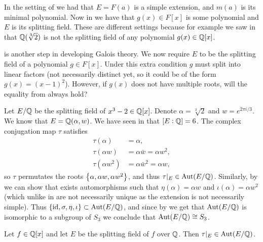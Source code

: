 \documentclass[11pt,a4paper]{article}
\begin{document}
\begin{remark}
  In the setting of 
  we had that $E = F(a)$ is a simple extension,
  and $m(a)$ is its minimal polynomial.
  Now in  we have that $g(x) \in F[x]$
  is some polynomial and $E$ is its splitting field.
  These are different settings because for example
  we saw in  that $\mathbb{Q}(\sqrt[3]{2})$
  is not the splitting field of any polynomial $g(x) \in \mathbb{Q}[x]$.
\end{remark}

\begin{question}
   is another step in developing Galois theory.
  We now require $E$ to be the splitting field of a polynomial $g \in F[x]$.
  Under this extra condition $g$ must split into linear factors (not necessarily
  distinct yet, so it could be of the form $g(x) = (x - 1)^2$).
  However, if $g(x)$ does not have multiple roots,
  will the equality from  always hold?
\end{question}

\begin{example}
  Let $E/\mathbb{Q}$ be the splitting field of $x^3 - 2 \in \mathbb{Q}[x]$.
  Denote $\alpha = \sqrt[3]{2}$ and $w = e^{2\pi i / 3}$.
  We know that $E = \mathbb{Q}(\alpha,w)$.
  We have seen in  that $[E : \mathbb{Q}] = 6$.
  The complex conjugation map $\tau$ satisfies
  \begin{align*}
    \tau(\alpha) &= \alpha, \\
    \tau(\alpha w) &= \alpha \bar w = \alpha w^2, \\
    \tau(\alpha w^2) &= \alpha \bar w^2 = \alpha w,
  \end{align*}
  so $\tau$ permutates the roots $\left\{\alpha,\alpha w,\alpha w^2\right\}$,
  and thus $\tau\vert_{E} \in \operatorname{Aut}(E/\mathbb{Q})$.
  Similarly, by 
  we can show that exists automorphisms such that
  $\eta(\alpha) = \alpha w$ and $\iota(\alpha) = \alpha w^2$
  (which unlike in 
  are not necessarily unique as the extension is not necessarily simple).
  Thus $\left\{\operatorname{id},\sigma,\eta,\iota\right\} \subset \operatorname{Aut}(E/\mathbb{Q})$,
  and since by  we get that $\operatorname{Aut}(E/\mathbb{Q})$
  is isomorphic to a subgroup of $S_3$ we conclude that $\operatorname{Aut}(E/\mathbb{Q}) \cong S_3$.
\end{example}

\begin{exercise}
  Let $f \in \mathbb{Q}[x]$ and let $E$ be the splitting field of $f$ over $\mathbb{Q}$.
  Then $\tau\vert_{E} \in \operatorname{Aut}(E/\mathbb{Q})$.
\end{exercise}
\end{document}
